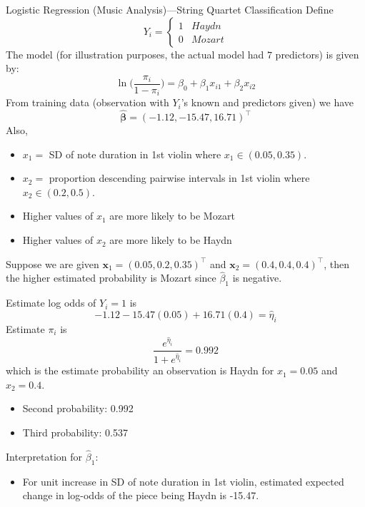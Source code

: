 \begin{Example}{Logistic Regression (Music Analysis)---String Quartet Classification}{}
    Define
    \[ Y_i=\begin{cases*}
            1 & Haydn\\
            0 & Mozart
        \end{cases*} \]
    The model (for illustration purposes, the actual model
    had $ 7 $ predictors) is given by:
    \[ \ln\biggl(\frac{\pi_i}{1-\pi_i}\biggr)=\beta_0+\beta_1x_{i1}+\beta_2x_{i2} \]
    From training data (observation with $ Y_i $'s known and predictors given)
    we have
    \[ \symbf{\hat{\beta}}=(-1.12,-15.47,16.71)^\top \]
    Also,
    \begin{itemize}
        \item $ x_1= $ SD of note duration in 1st violin
              where $ x_1\in(0.05, 0.35) $.
        \item $ x_2= $ proportion descending pairwise intervals
              in 1st violin
              where $ x_2\in(0.2,0.5) $.
    \end{itemize}
    \begin{itemize}
        \item Higher values of $ x_1 $ are more likely to be Mozart
        \item Higher values of $ x_2 $ are more likely to be Haydn
    \end{itemize}
    Suppose we are given
    $ \symbf{x}_1=(0.05,0.2,0.35)^\top $ and $ \symbf{x}_2=(0.4, 0.4, 0.4)^\top $,
    then the higher estimated probability is Mozart since $ \hat{\beta}_1 $
    is negative.

    Estimate log odds of $ Y_i=1 $ is
    \[ -1.12-15.47(0.05)+16.71(0.4)=\hat{\eta}_i \]
    Estimate $ \pi_i $ is
    \[ \frac{e^{\hat{\eta}_i}}{1+e^{\hat{\eta}_i}}=0.992  \]
    which is the estimate probability an observation
    is Haydn for $ x_1=0.05 $ and $ x_2=0.4 $.
    \begin{itemize}
        \item Second probability: 0.992
        \item Third probability: 0.537
    \end{itemize}
    Interpretation for $ \hat{\beta}_1 $:
    \begin{itemize}
        \item For unit increase in SD of note duration in 1st violin,
              estimated expected change in log-odds of the piece being Haydn
              is -15.47.
    \end{itemize}
\end{Example}
